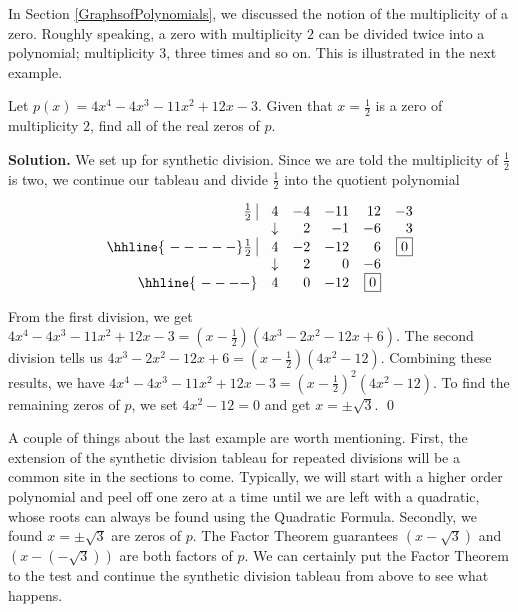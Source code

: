 In Section \ref{GraphsofPolynomials}, we discussed the notion of the multiplicity of a zero.  Roughly speaking, a zero with multiplicity $2$ can be divided twice into a polynomial;  multiplicity $3$, three times and so on.  This is illustrated in the next example.

\begin{ex}  Let $p(x) = 4x^4-4x^3-11x^2+12x-3$.  Given that $x=\frac{1}{2}$ is a zero of multiplicity $2$,  find all of the real zeros of $p$.

\smallskip

{\bf Solution.}  We set up for synthetic division.  Since we are told the multiplicity of $\frac{1}{2}$ is two, we continue our tableau and divide $\frac{1}{2}$ into the quotient polynomial

\[\begin{array}{rrrrrr}
 \frac{1}{2} \, \, \vline& 4 & -4 & -11  & 12 & -3 \\

   & \downarrow &  2  &  -1  & -6 & 3\\ \hhline{~-----} 
   
  \frac{1}{2} \, \, \vline&  4  &   -2  & -12 & 6 &  \fbox{$0$}  \\
    
      & \downarrow &  2  &  0  & -6 &\\ \hhline{~----} 
      
       & 4  &   0  & -12 & \fbox{0} &   \\  



\end{array}\]

From the first division, we get $4x^4-4x^3-11x^2+12x-3=\left(x-\frac{1}{2}\right) \left(4x^3-2x^2-12x+6\right)$.  The second division tells us $4x^3-2x^2-12x+6=\left(x-\frac{1}{2}\right)\left(4x^2-12\right)$.  Combining these results, we have  $4x^4-4x^3-11x^2+12x-3 = \left(x-\frac{1}{2}\right)^2\left(4x^2-12\right)$.  To find the remaining zeros of $p$, we set $4x^2-12=0$ and get $x = \pm \sqrt{3}$.  \qed

\end{ex}

A couple of things about the last example are worth mentioning. First, the extension of the synthetic division tableau for repeated divisions will be a common site in the sections to come. Typically, we will start with a higher order polynomial and peel off one zero at a time until we are left with a quadratic, whose roots can always be found using the Quadratic Formula.  Secondly, we found $x = \pm \sqrt{3}$ are zeros of $p$.  The Factor Theorem guarantees $\left(x-\sqrt{3}\right)$ and $\left(x - \left(-\sqrt{3}\right)\right)$ are both factors of $p$.  We can certainly put the Factor Theorem to the test and continue the synthetic division tableau from above to see what happens.

